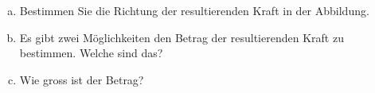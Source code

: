 
\begin{aufgabe}
	\begin{enumerate}[a)]
		\item Bestimmen Sie die Richtung der resultierenden Kraft in der Abbildung.
		\item Es gibt zwei Möglichkeiten den Betrag der resultierenden Kraft zu bestimmen. Welche sind das?
		\item Wie gross ist der Betrag?
	\end{enumerate}
\end{aufgabe}
